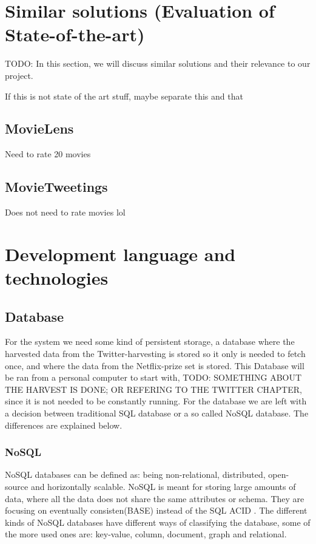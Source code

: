 \section{Similar solutions (Evaluation of State-of-the-art)}

TODO:
In this section, we will discuss similar solutions and their relevance to our project.

If this is not state of the art stuff, maybe separate this and that


\subsection{MovieLens}
Need to rate 20 movies
\subsection{MovieTweetings}
Does not need to rate movies lol



\section{Development language and technologies}

\subsection{Database}
For the system we need some kind of persistent storage, a database where the harvested data from the Twitter-harvesting is stored so it only is needed to fetch once, and where the data from the Netflix-prize set is stored. This Database will be ran from a personal computer to start with, TODO: SOMETHING ABOUT THE HARVEST IS DONE; OR REFERING TO THE TWITTER CHAPTER, since it is not needed to be constantly running. For the database we are left with a decision between traditional SQL database or a so called NoSQL database. The differences are explained below.

\subsubsection*{NoSQL}
NoSQL databases can be defined as: being non-relational, distributed, open-source and horizontally scalable\cite{nosql}. NoSQL is meant for storing large amounts of data\cite{bigdata}, where all the data does not share the same attributes or schema. They are focusing on eventually consisten(BASE) instead of the SQL ACID \cite{pritchett}. The different kinds of NoSQL databases have different ways of classifying the database, some of the more used ones are: key-value, column, document, graph and relational.

